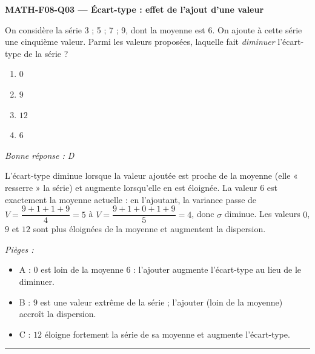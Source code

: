 \documentclass[11pt,a4paper]{article}
\begin{document}
\noindent\textbf{MATH-F08-Q03 --- Écart-type : effet de l'ajout d'une valeur}\par
On considère la série 3 ; 5 ; 7 ; 9, dont la moyenne est $6$. On ajoute à cette série une cinquième valeur. Parmi les valeurs proposées, laquelle fait \emph{diminuer} l'écart-type de la série ?
\begin{enumerate}[label=\Alph*)]
\item $0$
\item $9$
\item $12$
\item $6$
\end{enumerate}
\textit{Bonne réponse : D}\par
L'écart-type diminue lorsque la valeur ajoutée est proche de la moyenne (elle « resserre » la série) et augmente lorsqu'elle en est éloignée. La valeur $6$ est exactement la moyenne actuelle : en l'ajoutant, la variance passe de $V=\dfrac{9+1+1+9}{4}=5$ à $V=\dfrac{9+1+0+1+9}{5}=4$, donc $\sigma$ diminue. Les valeurs $0$, $9$ et $12$ sont plus éloignées de la moyenne et augmentent la dispersion.\par
\textit{Pièges :}
\begin{itemize}
\item A : $0$ est loin de la moyenne $6$ : l'ajouter augmente l'écart-type au lieu de le diminuer.
\item B : $9$ est une valeur extrême de la série ; l'ajouter (loin de la moyenne) accroît la dispersion.
\item C : $12$ éloigne fortement la série de sa moyenne et augmente l'écart-type.
\end{itemize}
\vspace{8pt}\hrule\vspace{8pt}
\end{document}
